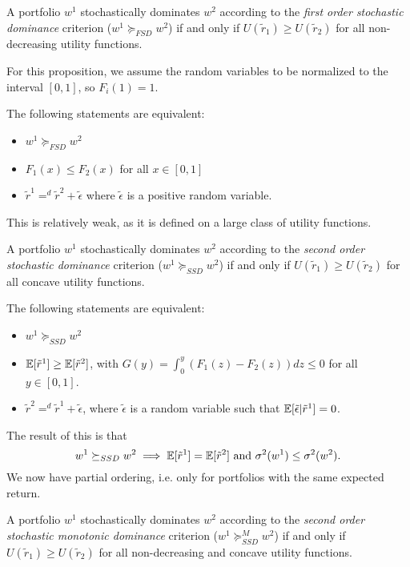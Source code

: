 \documentclass[twoside]{article}
\begin{document}
\begin{definition}
    A portfolio $w^1$ stochastically dominates $w^2$ according to the \textit{first order stochastic dominance} criterion ($w^1 \succeq_{FSD} w^2$) if and only if $U(\tilde{r}_1) \geq U(\tilde{r}_2)$ for all non-decreasing utility functions.
\end{definition}

For this proposition, we assume the random variables to be normalized to the interval $[0, 1]$, so $F_i(1) = 1$.
\begin{proposition}
    The following statements are equivalent:
    \begin{itemize}
        \item $w^1 \succeq_{FSD} w^2$
        \item $F_1(x) \leq F_2(x)$ for all $x \in [0, 1]$
        \item $\tilde{r}^1 =^d \tilde{r}^2 + \tilde{\epsilon}$ where $\tilde{\epsilon}$ is a positive random variable.
    \end{itemize}
\end{proposition}
This is relatively weak, as it is defined on a large class of utility functions.
\begin{definition}
    A portfolio $w^1$ stochastically dominates $w^2$ according to the \textit{second order stochastic dominance} criterion ($w^1 \succeq_{SSD} w^2$) if and only if $U(\tilde{r}_1) \geq U(\tilde{r}_2)$ for all concave utility functions.
\end{definition}

\begin{proposition}
    The following statements are equivalent:
    \begin{itemize}
        \item $w^1 \succeq_{SSD} w^2$
        \item $\mathbb{E}[\tilde{r}^1] \geq \mathbb{E}[\tilde{r}^2]$, with $G(y) = \int_0^y\left(F_1(z) - F_2(z)\right) dz \leq 0$ for all $y \in [0, 1]$.
        \item $\tilde{r}^2 =^d \tilde{r}^1 + \tilde{\epsilon}$, where $\tilde{\epsilon}$ is a random variable such that $\mathbb{E}[\tilde{\epsilon} | \tilde{r}^1] = 0$.
    \end{itemize}
\end{proposition}
The result of this is that
\[
    w^1 \succeq_{SSD} w^2 \implies \mathbb{E}[\tilde{r}^1] = \mathbb{E}[\tilde{r}^2] \text{ and } \sigma^2(w^1) \leq \sigma^2(w^2).
\]
We now have partial ordering, i.e. only for portfolios with the same expected return.
\begin{definition}
    A portfolio $w^1$ stochastically dominates $w^2$ according to the \textit{second order stochastic monotonic dominance} criterion ($w^1 \succeq_{SSD}^M w^2$) if and only if $U(\tilde{r}_1) \geq U(\tilde{r}_2)$ for all non-decreasing and concave utility functions.
\end{definition}
\end{document}
